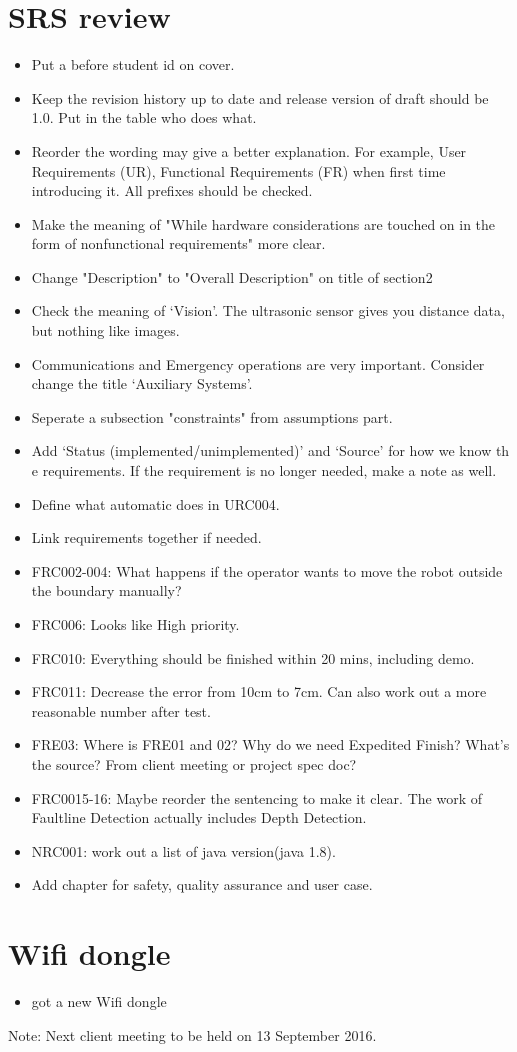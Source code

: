 \documentclass[11pt, a4paper]{article}
\begin{document}
\section{SRS review}
\begin{itemize}
\item Put a before student id on cover.
\item Keep the revision history up to date and release version of draft should be 1.0. Put in the table who does what.
\item Reorder the wording may give a better explanation. For example, User Requirements (UR), Functional Requirements (FR) when first time introducing it. All prefixes should be checked.
\item Make the meaning of "While hardware considerations are touched on in the form of nonfunctional requirements" more clear.
\item Change "Description" to "Overall Description" on title of section2
\item Check the meaning of ‘Vision’. The ultrasonic sensor gives you distance data, but nothing like images.
\item Communications and Emergency operations are very important. Consider change the title ‘Auxiliary Systems’.
\item Seperate a subsection "constraints" from assumptions part.
\item Add ‘Status (implemented/unimplemented)’ and ‘Source’ for how we know th e requirements. If the requirement is no longer needed, make a note as well.
\item Define what automatic does in URC004.
\item Link requirements together if needed.
\item FRC002-004: What happens if the operator wants to move the robot outside the boundary manually?
\item FRC006: Looks like High priority.
\item FRC010: Everything should be finished within 20 mins, including demo.
\item FRC011: Decrease the error from 10cm to 7cm. Can also work out a more reasonable number after test.
\item FRE03: Where is FRE01 and 02? Why do we need Expedited Finish? What’s the source? From client meeting or project spec doc?
\item FRC0015-16: Maybe reorder the sentencing to make it clear. The work of Faultline Detection actually includes Depth Detection.
\item NRC001: work out a list of java version(java 1.8).
\item Add chapter for safety, quality assurance and user case.
\end{itemize}

\section{Wifi dongle}
\begin{itemize}
\item got a new Wifi dongle
\end{itemize}


\vspace*{10pt}
\noindent Note: Next client meeting to be held on 13 September 2016.
\end{document}
